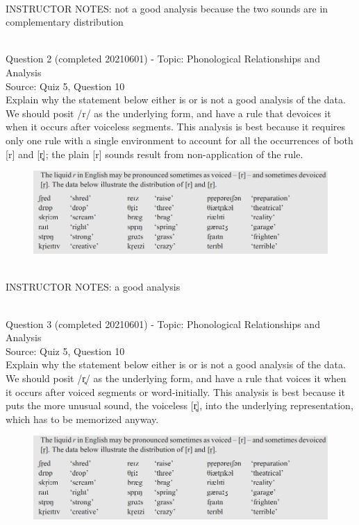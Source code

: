 \documentclass[12pt]{article}
\begin{document}
~\\
INSTRUCTOR NOTES: not a good analysis because the two sounds are in complementary distribution


~\\

{\large Question 2} (completed 20210601) - Topic: Phonological Relationships and Analysis\\
Source: Quiz 5, Question 10\\

Explain why the statement below either is or is not a good analysis of the data.\\

We should posit /r/ as the underlying form, and have a rule that devoices it when it occurs after voiceless segments. This analysis is best because it requires only one rule with a single environment to account for all the occurrences of both {[r]} and {[r̥]}; the plain {[r]} sounds result from non-application of the rule.

\begin{figure}[H]
\includegraphics{../images/peng71_englishr.png}
\end{figure}

~\\
INSTRUCTOR NOTES: a good analysis


~\\

{\large Question 3} (completed 20210601) - Topic: Phonological Relationships and Analysis\\
Source: Quiz 5, Question 10\\

Explain why the statement below either is or is not a good analysis of the data.\\

We should posit /r̥/ as the underlying form, and have a rule that voices it when it occurs after voiced segments or word-initially. This analysis is best because it puts the more unusual sound, the voiceless {[r̥]}, into the underlying representation, which has to be memorized anyway.

\begin{figure}[H]
\includegraphics{../images/peng71_englishr.png}
\end{figure}
\end{document}
